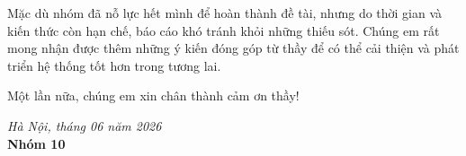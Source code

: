 Mặc dù nhóm đã nỗ lực hết mình để hoàn thành đề tài, nhưng do thời gian và kiến thức còn hạn chế, báo cáo khó tránh khỏi những thiếu sót. Chúng em rất mong nhận được thêm những ý kiến đóng góp từ thầy để có thể cải thiện và phát triển hệ thống tốt hơn trong tương lai.

Một lần nữa, chúng em xin chân thành cảm ơn thầy!

\vspace{1cm}
\begin{flushright}
\textit{Hà Nội, tháng 06 năm 2026}\\
\textbf{Nhóm 10}
\end{flushright}
